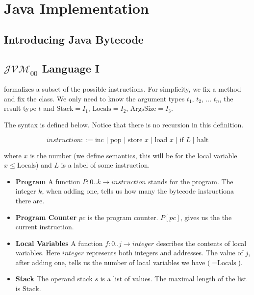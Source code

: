 
\chapter{Java Implementation}



\section{Introducing Java Bytecode}




\section{$\mathcal{JVM}_{00}$ Language I}

formalizes a subset of the possible instructions.
For simplicity, we fix a method and fix the class. 
We only need to know the argument types 
$t_1$, $t_2$, ... $t_n$, the result type $t$ and 
$\text{Stack} = I_1$, $\text{Locals} = I_2$, $\text{ArgsSize} = I_3$.

The syntax is defined below. Notice that there is no recursion in 
this definition. 

$$instruction ::= \text{inc } | \text{ pop } | \text{ store } x\; | \text{ load } x\; | \text{ if } L\; | \text{ halt}$$

where $x$ is the number (we define semantics, this will be for the local variable $x \leqslant \text{Locals}$)  
and $L$ is a label of some instruction.

\frmrule

\begin{itemize}   
\renewcommand{\labelitemi}{$\Box$}
\item \textbf{Program} A function $P: 0..k \rightarrow instruction$ stands for the program. 
The integer $k$, when adding one, tells us how many the bytecode instructiona there are. 
\item \textbf{Program Counter} $pc$ is the program counter. $P[pc]$, gives us the 
the current instruction. 
\item \textbf{Local Variables} A function $f: 0..j \rightarrow integer$ 
describes the contents of local variables. Here $integer$
represents both integers and addresses. The value of $j$, after adding one,
tells us the number of local variables we have ($= \text{Locals}$).
\item \textbf{Stack} The operand stack $s$ is a list of values. 
The maximal length of the list is $\text{Stack}$.
\end{itemize} 


